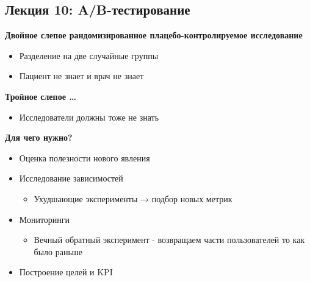 \documentclass[a4paper, 12pt]{article}
\begin{document}
\subsection{\texorpdfstring{\textbf{Лекция 10:
A/B-тестирование}}{Лекция 10: A/B-тестирование}}\label{ux43bux435ux43aux446ux438ux44f-10-ab-ux442ux435ux441ux442ux438ux440ux43eux432ux430ux43dux438ux435}

\textbf{Двойное слепое рандомизированное плацебо-контролируемое
исследование}

\begin{itemize}
\item
  
  Разделение на две {случайные} группы
  
\item
  
  Пациент не знает и врач не знает
  
\end{itemize}

\textbf{Тройное слепое \ldots{}}

\begin{itemize}
\item
  
  Исследователи должны тоже не знать
  
\end{itemize}

\textbf{Для чего нужно?}

\begin{itemize}
\item
  
  Оценка полезности нового явления
  
\item
  
  Исследование зависимостей
  

  \begin{itemize}
  \item
    
    Ухудшающие эксперименты → подбор новых метрик
    
  \end{itemize}
\item
  
  Мониторинги
  

  \begin{itemize}
  \item
    
    Вечный обратный эксперимент - возвращаем части пользователей то как
    было раньше
    
  \end{itemize}
\item
  
  Построение целей и KPI
  
\end{itemize}
\end{document}
